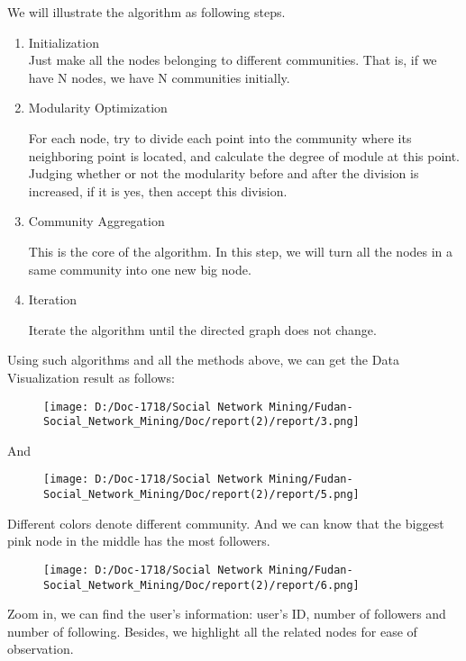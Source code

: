 \documentclass[]{article}
\begin{document}
We will illustrate the algorithm as following steps.

\begin{enumerate}
\def\labelenumi{\arabic{enumi}.}
\item
  Initialization\\

  Just make all the nodes belonging to different communities. That is,
  if we have N nodes, we have N communities initially.
\item
  Modularity Optimization

  For each node, try to divide each point into the community where its
  neighboring point is located, and calculate the degree of module at
  this point. Judging whether or not the modularity before and after the
  division is increased, if it is yes, then accept this division.
\item
  Community Aggregation

  This is the core of the algorithm. In this step, we will turn all the
  nodes in a same community into one new big node. 
\item
  Iteration

  Iterate the algorithm until the directed graph does not change.
\end{enumerate}

Using such algorithms and all the methods above, we can get the Data
Visualization result as follows:

\begin{figure}
\centering
\texttt{[image: D:/Doc-1718/Social Network Mining/Fudan-Social\_Network\_Mining/Doc/report(2)/report/3.png]}
\caption{}
\end{figure}

And

\begin{figure}
\centering
\texttt{[image: D:/Doc-1718/Social Network Mining/Fudan-Social\_Network\_Mining/Doc/report(2)/report/5.png]}
\caption{}
\end{figure}

Different colors denote different community. And we can know that the
biggest pink node in the middle has the most followers.

\begin{figure}
\centering
\texttt{[image: D:/Doc-1718/Social Network Mining/Fudan-Social\_Network\_Mining/Doc/report(2)/report/6.png]}
\caption{}
\end{figure}

Zoom in, we can find the user's information: user's ID, number of
followers and number of following. Besides, we highlight all the related
nodes for ease of observation.
\end{document}
